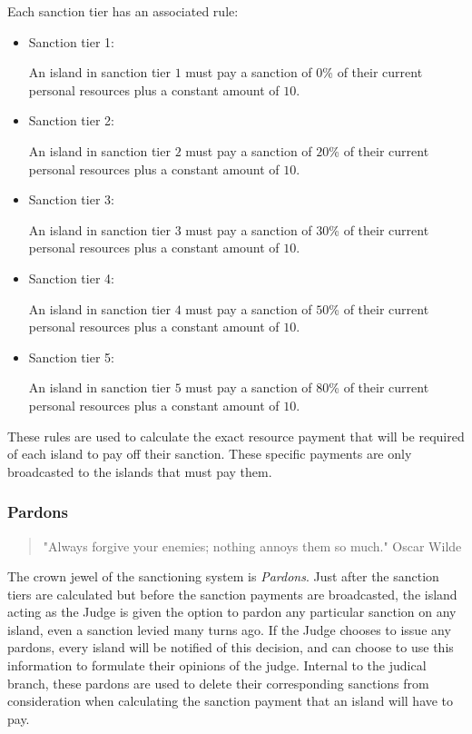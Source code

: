 Each sanction tier has an associated rule:
\begin{itemize}
    \item Sanction tier 1: \begin{rule_IIGO} 
        An island in sanction tier $1$ must pay a sanction of $0$\% of their current personal resources plus a constant amount of $10$.
    \end{rule_IIGO}
    \item Sanction tier 2: \begin{rule_IIGO} 
        An island in sanction tier $2$ must pay a sanction of $20$\% of their current personal resources plus a constant amount of $10$.
    \end{rule_IIGO}
    \item Sanction tier 3: \begin{rule_IIGO} 
        An island in sanction tier $3$ must pay a sanction of $30$\% of their current personal resources plus a constant amount of $10$.
    \end{rule_IIGO}
    \item Sanction tier 4: \begin{rule_IIGO} 
        An island in sanction tier $4$ must pay a sanction of $50$\% of their current personal resources plus a constant amount of $10$.
    \end{rule_IIGO}
    \item Sanction tier 5: \begin{rule_IIGO} 
        An island in sanction tier $5$ must pay a sanction of $80$\% of their current personal resources plus a constant amount of $10$.
    \end{rule_IIGO}
\end{itemize}

These rules are used to calculate the exact resource payment that will be required of each island to pay off their sanction. These specific payments are only broadcasted to the islands that must pay them.

\subsubsection{Pardons}
\begin{quote}
    "Always forgive your enemies; nothing annoys them so much."
    \noindent Oscar Wilde
\end{quote}
The crown jewel of the sanctioning system is \emph{Pardons}. Just after the sanction tiers are calculated but before the sanction payments are broadcasted, the island acting as the Judge is given the option to pardon any particular sanction on any island, even a sanction levied many turns ago. 
If the Judge chooses to issue any pardons, every island will be notified of this decision, and can choose to use this information to formulate their opinions of the judge. 
Internal to the judical branch, these pardons are used to delete their corresponding sanctions from consideration when calculating the sanction payment that an island will have to pay.
